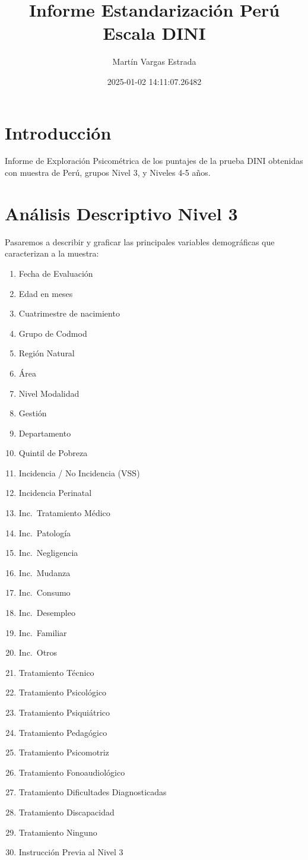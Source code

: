 \documentclass[
]{article}
\title{Informe Estandarización Perú Escala DINI}
\author{Martín Vargas Estrada}
\date{2025-01-02 14:11:07.26482}
\providecommand{\tightlist}{%
  \setlength{\itemsep}{0pt}\setlength{\parskip}{0pt}}
\begin{document}
\maketitle

{
\setcounter{tocdepth}{4}
\tableofcontents
}
\newpage

\section{Introducción}\label{introducciuxf3n}

Informe de Exploración Psicométrica de los puntajes de la prueba DINI
obtenidas con muestra de Perú, grupos Nivel 3, y Niveles 4-5 años.

\section{Análisis Descriptivo Nivel
3}\label{anuxe1lisis-descriptivo-nivel-3}

Pasaremos a describir y graficar las principales variables demográficas
que caracterizan a la muestra:

\begin{enumerate}
\def\labelenumi{\arabic{enumi}.}
\tightlist
\item
  Fecha de Evaluación
\item
  Edad en meses
\item
  Cuatrimestre de nacimiento
\item
  Grupo de Codmod
\item
  Región Natural
\item
  Área
\item
  Nivel Modalidad
\item
  Gestión
\item
  Departamento
\item
  Quintil de Pobreza
\item
  Incidencia / No Incidencia (VSS)
\item
  Incidencia Perinatal
\item
  Inc.~Tratamiento Médico
\item
  Inc.~Patología
\item
  Inc.~Negligencia
\item
  Inc.~Mudanza
\item
  Inc.~Consumo
\item
  Inc.~Desempleo
\item
  Inc.~Familiar
\item
  Inc.~Otros
\item
  Tratamiento Técnico
\item
  Tratamiento Psicológico
\item
  Tratamiento Psiquiátrico
\item
  Tratamiento Pedagógico
\item
  Tratamiento Psicomotriz
\item
  Tratamiento Fonoaudiológico
\item
  Tratamiento Dificultades Diagnosticadas
\item
  Tratamiento Discapacidad
\item
  Tratamiento Ninguno
\item
  Instrucción Previa al Nivel 3
\end{enumerate}
\end{document}

